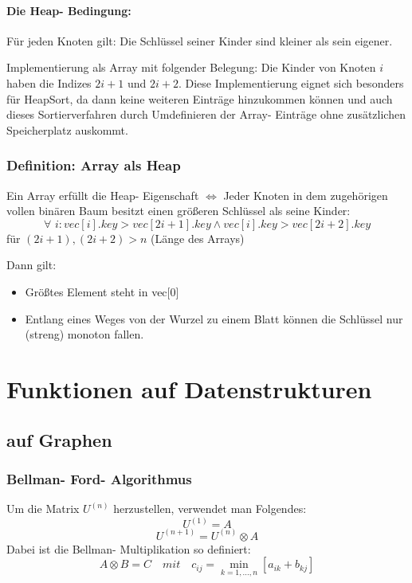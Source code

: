 \documentclass[fleqn]{scrartcl}
\begin{document}
\paragraph*{Die Heap- Bedingung:}
Für jeden Knoten gilt: Die Schlüssel seiner Kinder sind kleiner als sein eigener. 

Implementierung als Array mit folgender Belegung: Die Kinder von Knoten $i$ haben die Indizes $2i + 1$ und $2i + 2$. Diese Implementierung eignet sich besonders für HeapSort, da dann keine weiteren Einträge hinzukommen können und auch dieses Sortierverfahren durch Umdefinieren der Array- Einträge ohne zusätzlichen Speicherplatz auskommt.

\subsubsection{Definition: Array als Heap}
Ein Array erfüllt die Heap- Eigenschaft $\Leftrightarrow$ Jeder Knoten in dem zugehörigen vollen binären Baum besitzt einen größeren Schlüssel als seine Kinder:
\[\forall \,\, i : vec[i].key > vec[2i + 1].key \land vec[i].key > vec[2i+2].key\]
für $(2i+1), (2i+2) > n$ (Länge des Arrays)

Dann gilt: \begin{itemize}
\item Größtes Element steht in vec[0]
\item Entlang eines Weges von der Wurzel zu einem Blatt können die Schlüssel nur (streng) monoton fallen.
\end{itemize}


\newpage
\section{Funktionen auf Datenstrukturen}
\subsection{auf Graphen}
\subsubsection{Bellman- Ford- Algorithmus}
Um die Matrix $U^{(n)}$ herzustellen, verwendet man Folgendes:
\[U^{(1)} = A\]
\[U^{(n+1)} = U^{(n)} \otimes A\]
Dabei ist die Bellman- Multiplikation so definiert:
\[A \otimes B = C \quad mit \quad c_{ij} = \min_{k = 1, ..., n} [a_{ik} + b_{kj}]\]
\end{document}
